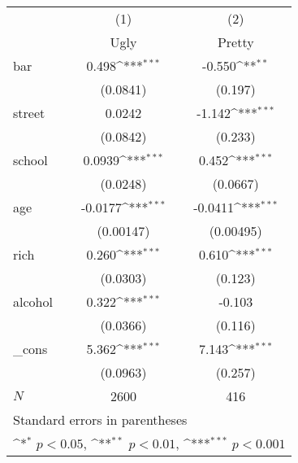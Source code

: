 {
\def\sym#1{\ifmmode^{#1}\else\(^{#1}\)\fi}
\begin{tabular}{l*{2}{c}}
\hline\hline
            &\multicolumn{1}{c}{(1)}&\multicolumn{1}{c}{(2)}\\
            &\multicolumn{1}{c}{Ugly}&\multicolumn{1}{c}{Pretty}\\
\hline
bar         &       0.498\sym{***}&      -0.550\sym{**} \\
            &    (0.0841)         &     (0.197)         \\
[1em]
street      &      0.0242         &      -1.142\sym{***}\\
            &    (0.0842)         &     (0.233)         \\
[1em]
school      &      0.0939\sym{***}&       0.452\sym{***}\\
            &    (0.0248)         &    (0.0667)         \\
[1em]
age         &     -0.0177\sym{***}&     -0.0411\sym{***}\\
            &   (0.00147)         &   (0.00495)         \\
[1em]
rich        &       0.260\sym{***}&       0.610\sym{***}\\
            &    (0.0303)         &     (0.123)         \\
[1em]
alcohol     &       0.322\sym{***}&      -0.103         \\
            &    (0.0366)         &     (0.116)         \\
[1em]
\_cons      &       5.362\sym{***}&       7.143\sym{***}\\
            &    (0.0963)         &     (0.257)         \\
\hline
\(N\)       &        2600         &         416         \\
\hline\hline
\multicolumn{3}{l}{\footnotesize Standard errors in parentheses}\\
\multicolumn{3}{l}{\footnotesize \sym{*} \(p<0.05\), \sym{**} \(p<0.01\), \sym{***} \(p<0.001\)}\\
\end{tabular}
}
